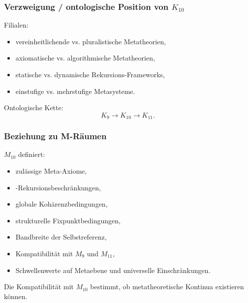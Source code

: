 \subsubsection{Verzweigung / ontologische Position von $K_{10}$}

Filialen:
\begin{itemize}
    \item vereinheitlichende vs. pluralistische Metatheorien,
    \item axiomatische vs. algorithmische Metatheorien,
    \item statische vs. dynamische Rekursions-Frameworks,
    \item einstufige vs. mehrstufige Metasysteme.
\end{itemize}

Ontologische Kette:
\[
K_9 \to K_{10} \to K_{11}.
\]

\subsubsection{Beziehung zu M-Räumen}

$M_{10}$ definiert:
\begin{itemize}
    \item zulässige Meta-Axiome,
    \item-Rekursionsbeschränkungen,
    \item globale Kohärenzbedingungen,
    \item strukturelle Fixpunktbedingungen,
    \item Bandbreite der Selbstreferenz,
    \item Kompatibilität mit $M_9$ und $M_{11}$,
    \item Schwellenwerte auf Metaebene und universelle Einschränkungen.
\end{itemize}

Die Kompatibilität mit $M_{10}$ bestimmt, ob metatheoretische Kontinua existieren können.
